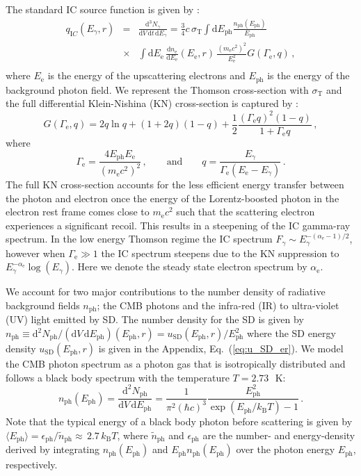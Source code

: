 \documentclass[10pt,aps,pra,reprint,amsmath,amsfonts,amssymb,showpacs,nofootinbib,floatfix]{revtex4-1}
\newcommand{\rmn}{\mathrm}
\newcommand{\ph}{\rmn{ph}}
\newcommand{\eph}{E_\ph}
\newcommand{\sd}{\rmn{SD}}
\newcommand{\ee}{E_\rmn{e}}
\newcommand{\B}{\rmn{B}}
\newcommand{\dd}{\rmn{d}}
\newcommand{\e}{\rmn{e}}
\newcommand{\eg}{E_\gamma}
\begin{document}
The standard IC source function is given by
\cite{1979rpa..book.....R}:
\begin{eqnarray}
  q_{\rmn IC}(\eg, r) &=&  \frac{\dd^3 N_\gamma}{\dd V\,\dd t\,\dd \eg} = 
 \frac{3}{4}c\,\sigma_\rmn{T}
\int\dd \eph \frac{n_\rmn{ph}(\eph)}{\eph}\nonumber\\
&\times& \int \dd \ee\,\frac{\dd n_\e}{\dd \ee}(\ee,r)\,
 \frac{\left(m_\e c^2\right)^2}{\ee^2}G(\Gamma_\e,q)\,,\nonumber\\
  \label{eq:ICemiss}
\end{eqnarray}
where $\ee$ is the energy of the upscattering electrons and $\eph$ is
the energy of the background photon field. We represent the Thomson
cross-section with $\sigma_\rmn{T}$ and the full differential
Klein-Nishina (KN) cross-section is captured by
\cite{1970RvMP...42..237B}:
\begin{equation}
\label{eq:KN_spec}
G(\Gamma_\e,q) = 2q\ln{q}+(1+2q)(1-q)+ 
\frac{1}{2}\frac{\left(\Gamma_\e q\right)^2\left(1-q\right)}
     {1+\Gamma_\e q}\,,
\end{equation}
where
\begin{equation}
\Gamma_\e=\frac{4\eph \ee}{\left(m_\e c^2\right)^2}\,,\qquad \rmn{and} \qquad  
q=\frac{\eg}{\Gamma_\e\left(\ee-\eg\right)}\,.
\end{equation}
The full KN cross-section accounts for the less efficient energy
transfer between the photon and electron once the energy of the
Lorentz-boosted photon in the electron rest frame comes close to $m_\e
c^2$ such that the scattering electron experiences a significant
recoil. This results in a steepening of the IC gamma-ray spectrum. In
the low energy Thomson regime the IC spectrum $F_\gamma\sim
E_\gamma^{-(\alpha_\e-1)/2}$, however when $\Gamma_\e \gg 1$ the IC
spectrum steepens due to the KN suppression to
$\eg^{-\alpha_\e}\log(\eg)$. Here we denote the steady state electron
spectrum by $\alpha_\e$.

We account for two major contributions to the number density of
radiative background fields $n_\ph$; the CMB photons and the infra-red
(IR) to ultra-violet (UV) light emitted by SD. The number density for
the SD is given by $n_\ph\equiv\dd^2 N_\ph/ (\dd V \,\dd \eph) (\eph,r)=
u_\sd(\eph,r) /\eph^2$ where the SD energy density $u_\sd(\eph,r)$ is
given in the Appendix, Eq.~(\ref{eq:u_SD_er}). We model the CMB photon
spectrum as a photon gas that is isotropically distributed and follows
a black body spectrum with the temperature $T=2.73\,$~K:
\begin{equation}
\label{eq:photon_gas}
  n_\rmn{ph}(\eph) = \frac{\dd^2 N_\ph}{\dd V \,\dd \eph} =
  \frac{1}{\pi^2(\hbar c)^3}\frac{\eph^2}{\exp(\eph/k_\B T)-1}\,.
\end{equation}
Note that the typical energy of a black body photon before scattering
is given by $\langle\eph\rangle=\epsilon_\ph/\tilde{n}_\ph\approx\,2.7\, k_\B T$,
where $\tilde{n}_\ph$ and $\epsilon_\ph$ are the number- and
energy-density derived by integrating $n_\ph(\eph)$ and $\eph
n_\ph(\eph)$ over the photon energy $\eph$, respectively.
\end{document}
